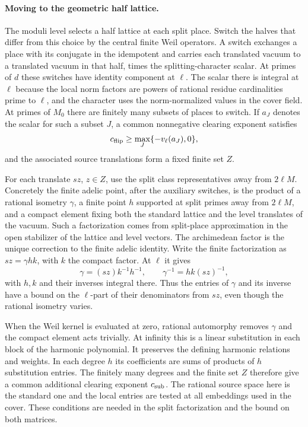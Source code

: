 \paragraph{Moving to the geometric half lattice.}
The moduli level selects a half lattice at each split
place. Switch the halves that differ from this choice by
the central finite Weil operators. A switch exchanges a
place with its conjugate in the idempotent and carries
each translated vacuum to a translated vacuum in that half,
times the splitting-character scalar. At primes of \(d\)
these switches have identity component at \(\ell\). The
scalar there is integral at \(\ell\) because the local norm factors
are powers of rational residue cardinalities prime to \(\ell\),
and the character uses the norm-normalized values in the
cover field. At primes of \(M_0\) there are finitely many
subsets of places to switch. If \(a_J\) denotes the scalar for such a subset \(J\), a common nonnegative clearing exponent satisfies
\[
 c_{\rm flip}\ge\max_J\{-v_\ell(a_J),0\},
\]
and the associated source
translations form a fixed finite set \(Z\).

For each translate \(sz\), \(z\in Z\), use the split
class representatives away from \(2\ell M\). Concretely
the finite adelic point, after the auxiliary switches, is
the product of a rational isometry \(\gamma\), a finite
point \(h\) supported at split primes away from \(2\ell M\),
and a compact element fixing both the standard lattice and
the level translates of the vacuum. Such a factorization
comes from split-place approximation in the open
stabilizer of the lattice and level vectors. The archimedean
factor is the unique correction to the finite adelic
identity. Write the finite factorization as \(sz=\gamma h k\), with \(k\) the compact factor. At \(\ell\) it gives
\[
 \gamma=(sz)k^{-1}h^{-1},\qquad \gamma^{-1}=hk(sz)^{-1},
\]
with \(h,k\) and their inverses integral there. Thus the
entries of \(\gamma\) and its inverse have a bound on the
\(\ell\)-part of their denominators from \(sz\), even though
the rational isometry varies.

When the Weil kernel is
evaluated at zero, rational automorphy removes \(\gamma\)
and the compact element acts trivially. At infinity this is
a linear substitution in each block of the harmonic
polynomial. It preserves the defining harmonic relations
and weights. In each degree \(h\) its coefficients are
sums of products of \(h\) substitution entries. The finitely
many degrees and the finite set \(Z\) therefore give a
common additional clearing exponent \(c_{\rm sub}\).
The rational source space here is the standard one and
the local entries are tested at all embeddings used in
the cover. These conditions are needed in the split
factorization and the bound on both matrices.

